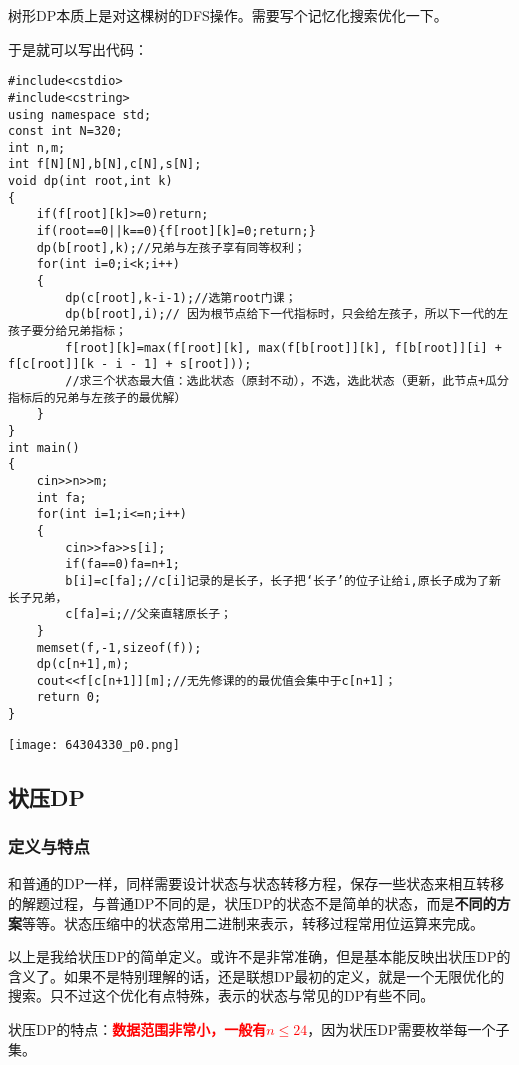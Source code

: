 树形DP本质上是对这棵树的DFS操作。需要写个记忆化搜索优化一下。

于是就可以写出代码：

\begin{verbatim}
#include<cstdio>
#include<cstring>
using namespace std;
const int N=320;
int n,m;
int f[N][N],b[N],c[N],s[N];
void dp(int root,int k)
{
    if(f[root][k]>=0)return;
    if(root==0||k==0){f[root][k]=0;return;}
    dp(b[root],k);//兄弟与左孩子享有同等权利；
    for(int i=0;i<k;i++)
    {
        dp(c[root],k-i-1);//选第root门课； 
        dp(b[root],i);// 因为根节点给下一代指标时，只会给左孩子，所以下一代的左孩子要分给兄弟指标；
        f[root][k]=max(f[root][k], max(f[b[root]][k], f[b[root]][i] + f[c[root]][k - i - 1] + s[root]));
        //求三个状态最大值：选此状态（原封不动），不选，选此状态（更新，此节点+瓜分指标后的兄弟与左孩子的最优解） 
    }
}
int main()
{
    cin>>n>>m;
    int fa;
    for(int i=1;i<=n;i++)
    {
        cin>>fa>>s[i];
        if(fa==0)fa=n+1; 
        b[i]=c[fa];//c[i]记录的是长子，长子把‘长子’的位子让给i,原长子成为了新长子兄弟， 
        c[fa]=i;//父亲直辖原长子； 
    }
    memset(f,-1,sizeof(f));
    dp(c[n+1],m);
    cout<<f[c[n+1]][m];//无先修课的的最优值会集中于c[n+1]； 
    return 0;
}
\end{verbatim}
\begin{center}\texttt{[image: 64304330\_p0.png]}\end{center}
\note
\subsection{状压DP}
\subsubsection{定义与特点}
\begin{definition}[状压DP]和普通的DP一样，同样需要设计状态与状态转移方程，保存一些状态来相互转移的解题过程，与普通DP不同的是，状压DP的状态不是简单的状态，而是\textbf{不同的方案}等等。状态压缩中的状态常用二进制来表示，转移过程常用位运算来完成。
\end{definition}

以上是我给状压DP的简单定义。或许不是非常准确，但是基本能反映出状压DP的含义了。如果不是特别理解的话，还是联想DP最初的定义，就是一个无限优化的搜索。只不过这个优化有点特殊，表示的状态与常见的DP有些不同。

状压DP的特点：\textcolor{red}{\textbf{数据范围非常小，一般有$n\leq 24$}}，因为状压DP需要枚举每一个子集。

